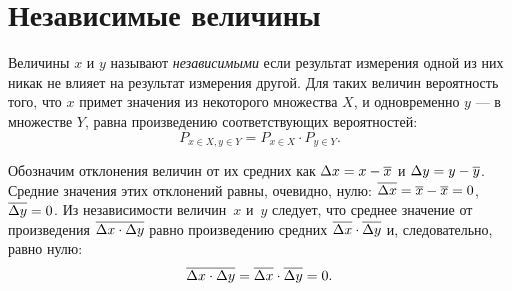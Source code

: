 
%


\section{Независимые величины}\label{sec:independent}
Величины $x$ и $y$ называют \emph{независимыми} если результат измерения одной 
из них никак не влияет на результат измерения другой. Для таких величин вероятность того, что  $x$ примет значения из некоторого множества $X$, и одновременно $y$ --- в множестве $Y$, 
равна произведению соответствующих вероятностей:
\[
P_{x\in X , y\in Y} = P_{x\in X}\cdot P_{y\in Y}.
\]

Обозначим отклонения величин от их средних как $\Delta x=x-\overline{x}$ и 
$\Delta y=y-\overline{y}$.
Средние значения этих отклонений равны, очевидно, нулю: 
$\overline{\Delta
x}=\overline{x}-\overline{x}=0$, $\overline{\Delta y}=0$.
Из независимости величин~$x$ и~$y$ следует,
что среднее значение от произведения 
$\overline{\Delta x\cdot\Delta y}$
равно произведению средних $\overline{\Delta x}\cdot\overline{\Delta y}$
и, следовательно, равно нулю:
\begin{equation}
\overline{\Delta x\cdot\Delta y}=\overline{\Delta x}\cdot\overline{\Delta
y}=0.\label{eq:indep}
\end{equation}

